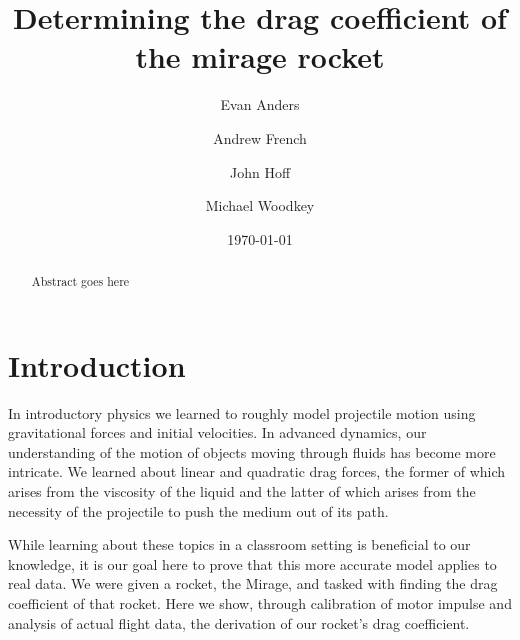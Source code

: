 \documentclass[aps,pra,twocolumn]{revtex4-1}
\begin{document}
\title{Determining the drag coefficient of the mirage rocket}

\author{Evan Anders}
\author{Andrew French}
\author{John Hoff}
\author{Michael Woodkey}


\date{\today}

\begin{abstract}
Abstract goes here
\end{abstract}



\maketitle


\section{\label{section1} Introduction}
In introductory physics we learned to roughly model projectile motion using gravitational forces and initial velocities.  In advanced dynamics, our understanding of the motion of objects moving through fluids has become more intricate.  We learned about linear and quadratic drag forces, the former of which arises from the viscosity of the liquid and the latter of which arises from the necessity of the projectile to push the medium out of its path.

While learning about these topics in a classroom setting is beneficial to our knowledge, it is our goal here to prove that this more accurate model applies to real data.  We were given a rocket, the Mirage, and tasked with finding the drag coefficient of that rocket.  Here we show, through calibration of motor impulse and analysis of actual flight data, the derivation of our rocket's drag coefficient.
\end{document}
